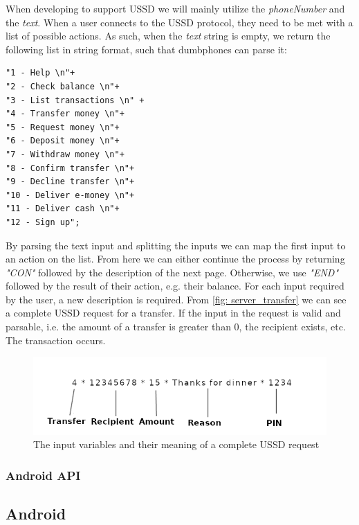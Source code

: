 \documentclass[11pt, a4paper]{article}
\begin{document}
When developing to support USSD we will mainly utilize the \textit{phoneNumber} and the \textit{text}. When a user connects to the USSD protocol, they need to be met with a list of possible actions. As such, when the \textit{text} string is empty, we return the following list in string format, such that dumbphones can parse it:
\begin{lstlisting}
"1 - Help \n"+
"2 - Check balance \n"+
"3 - List transactions \n" +
"4 - Transfer money \n"+
"5 - Request money \n"+
"6 - Deposit money \n"+
"7 - Withdraw money \n"+
"8 - Confirm transfer \n"+
"9 - Decline transfer \n"+
"10 - Deliver e-money \n"+
"11 - Deliver cash \n"+
"12 - Sign up";
\end{lstlisting}

By parsing the text input and splitting the inputs we can map the first input to an action on the list. From here we can either continue the process by returning \textit{"CON"} followed by the description of the next page. Otherwise, we use \textit{"END"} followed by the result of their action, e.g. their balance. For each input required by the user, a new description is required. From \autoref{fig: server_transfer} we can see a complete USSD request for a transfer. If the input in the request is valid and parsable, i.e. the amount of a transfer is greater than 0, the recipient exists, etc. The transaction occurs.

\begin{figure}[ht]
\centering
\includegraphics[width=1\linewidth]{figs/transfer_desc.png}
\caption{The input variables and their meaning of a complete USSD request}
\label{fig: server_transfer}
\end{figure}


\subsubsection{Android API}
\subsection{Android}
\end{document}
